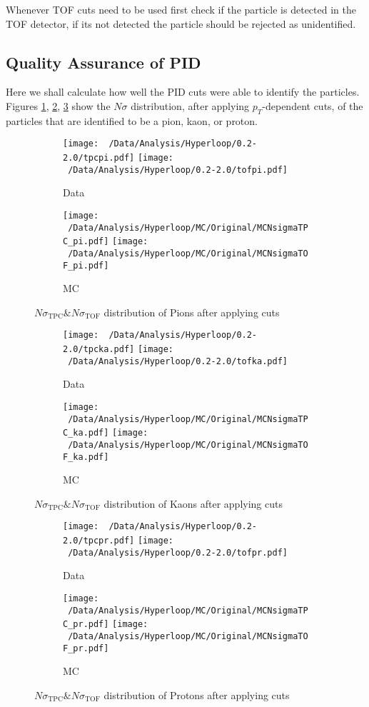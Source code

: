 \documentclass[12pt,a4paper,twoside]{report}
\begin{document}
Whenever TOF cuts need to be used first check if the particle is detected in the TOF detector, if its not detected the particle should be rejected as unidentified.
\subsection{Quality Assurance of PID}
Here we shall calculate how well the PID cuts were able to identify the particles. Figures \ref{Pion_nsigma}, \ref{Kaon_nsigma}, \ref{Proton_nsigma} show the $N\sigma$ distribution, after applying $p_{T}$-dependent cuts, of the particles that are identified to be a pion, kaon, or proton. 
\begin{figure}[H]
	\begin{subfigure}{\linewidth}
	\texttt{[image: ~/Data/Analysis/Hyperloop/0.2-2.0/tpcpi.pdf]}
	\texttt{[image: ~/Data/Analysis/Hyperloop/0.2-2.0/tofpi.pdf]}
	\caption{Data}
	\end{subfigure}
	\begin{subfigure}{\linewidth}
	\texttt{[image: ~/Data/Analysis/Hyperloop/MC/Original/MCNsigmaTPC\_pi.pdf]}
	\texttt{[image: ~/Data/Analysis/Hyperloop/MC/Original/MCNsigmaTOF\_pi.pdf]}
	\caption{MC}
	\end{subfigure}
	\caption{\label{Pion_nsigma}$N\sigma_\mathrm{TPC}\&N\sigma_\mathrm{TOF}$ distribution of Pions after applying cuts}
\end{figure}
\begin{figure}[H]
	\begin{subfigure}{\linewidth}
	\texttt{[image: ~/Data/Analysis/Hyperloop/0.2-2.0/tpcka.pdf]}
	\texttt{[image: ~/Data/Analysis/Hyperloop/0.2-2.0/tofka.pdf]}
	\caption{Data}
	\end{subfigure}
	\begin{subfigure}{\linewidth}
	\texttt{[image: ~/Data/Analysis/Hyperloop/MC/Original/MCNsigmaTPC\_ka.pdf]}
	\texttt{[image: ~/Data/Analysis/Hyperloop/MC/Original/MCNsigmaTOF\_ka.pdf]}
	\caption{MC}
	\end{subfigure}
	\caption{\label{Kaon_nsigma}$N\sigma_\mathrm{TPC}\&N\sigma_\mathrm{TOF}$ distribution of Kaons after applying cuts}
\end{figure}
\begin{figure}[H]
	\begin{subfigure}{\linewidth}
	\texttt{[image: ~/Data/Analysis/Hyperloop/0.2-2.0/tpcpr.pdf]}
	\texttt{[image: ~/Data/Analysis/Hyperloop/0.2-2.0/tofpr.pdf]}
	\caption{Data}
	\end{subfigure}
	\begin{subfigure}{\linewidth}
	\texttt{[image: ~/Data/Analysis/Hyperloop/MC/Original/MCNsigmaTPC\_pr.pdf]}
	\texttt{[image: ~/Data/Analysis/Hyperloop/MC/Original/MCNsigmaTOF\_pr.pdf]}
	\caption{MC}
	\end{subfigure}
	\caption{\label{Proton_nsigma}$N\sigma_\mathrm{TPC}\&N\sigma_\mathrm{TOF}$ distribution of Protons after applying cuts}
\end{figure}
\end{document}
